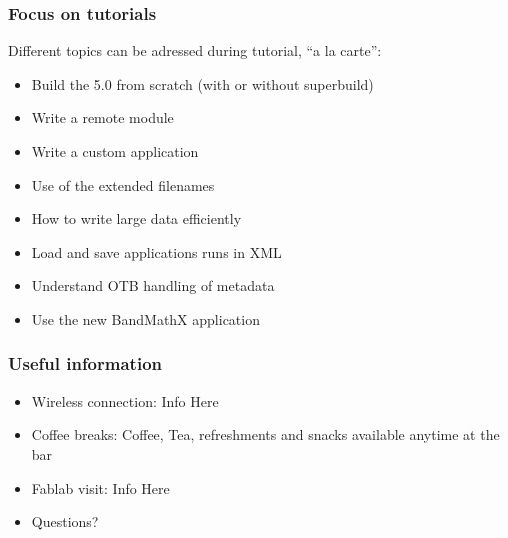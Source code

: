 \documentclass[8pt]{beamer}
\begin{document}
\begin{frame}
\frametitle{Focus on tutorials}
Different topics can be adressed during tutorial, ``a la carte'':
\begin{itemize}
\item Build the 5.0 from scratch (with or without superbuild)
\item Write a remote module
\item Write a custom application
\item Use of the extended filenames
\item How to write large data efficiently
\item Load and save applications runs in XML
\item Understand OTB handling of metadata
\item Use the new BandMathX application
\end{itemize}
\end{frame}

\begin{frame}
\frametitle{Useful information}
\begin{itemize}
\item Wireless connection: Info Here
\item Coffee breaks: Coffee, Tea, refreshments and snacks available anytime at the bar
\item Fablab visit: Info Here
\item Questions?
\end{itemize}

\end{frame}
\end{document}
